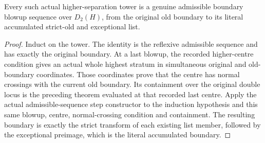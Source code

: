 \begin{lemma}
\label{hir:general-nc-double-locus-geometric-admissibility}
\leanok
{}
Every such actual higher-separation tower is a genuine admissible
boundary blowup sequence over $D_2(H)$, from the original old boundary
to its literal accumulated strict-old and exceptional list.
\end{lemma}
\begin{proof}
Induct on the tower. The identity is the reflexive admissible
sequence and has exactly the original boundary. At a last blowup,
the recorded higher-centre condition gives an actual whole highest
stratum in simultaneous original and old-boundary coordinates.
Those coordinates prove that the centre has normal crossings with
the current old boundary. Its containment over the original double
locus is the preceding theorem evaluated at that recorded last
centre. Apply the actual admissible-sequence step constructor to
the induction hypothesis and this same blowup, centre, normal-crossing
condition and containment. The resulting boundary is exactly the
strict transform of each existing list member, followed by the
exceptional preimage, which is the literal accumulated boundary.
\end{proof}

